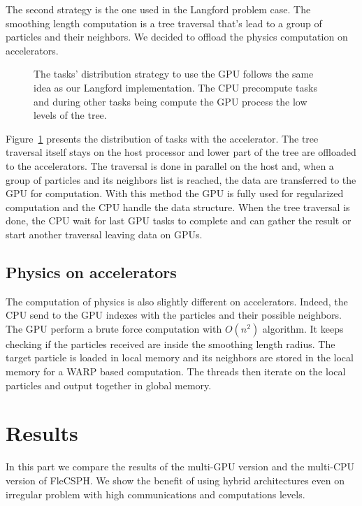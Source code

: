 The second strategy is the one used in the Langford problem case. 
The smoothing length computation is a tree traversal that's lead to a group of particles and their neighbors. 
We decided to offload the physics computation on accelerators. 

\begin{figure}[t!]

\caption[Tasks distribution using GPUs]{The tasks' distribution strategy to use the GPU follows the same idea as our Langford implementation. The CPU precompute tasks and during other tasks being compute the GPU process the low levels of the tree.}
\label{fig:multi_gpu_implementation}
\end{figure}
Figure~\ref{fig:multi_gpu_implementation} presents the distribution of tasks with the accelerator. 
The tree traversal itself stays on the host processor and lower part of the tree are offloaded to the accelerators. 
The traversal is done in parallel on the host and, when a group of particles and its neighbors list is reached, the data are transferred to the GPU for computation. 
With this method the GPU is fully used for regularized computation and the CPU handle the data structure. 
When the tree traversal is done, the CPU wait for last GPU tasks to complete and can gather the result or start another traversal leaving data on GPUs. 

\subsection{Physics on accelerators}
The computation of physics is also slightly different on accelerators. 
Indeed, the CPU send to the GPU indexes with the particles and their possible neighbors. 
The GPU perform a brute force computation with $O(n^2)$ algorithm. 
It keeps checking if the particles received are inside the smoothing length radius. 
The target particle is loaded in local memory and its neighbors are stored in the local memory for a WARP based computation.
The threads then iterate on the local particles and output together in global memory.

\section{Results}
In this part we compare the results of the multi-GPU version and the multi-CPU version of FleCSPH. 
We show the benefit of using hybrid architectures even on irregular problem with high communications and computations levels.

